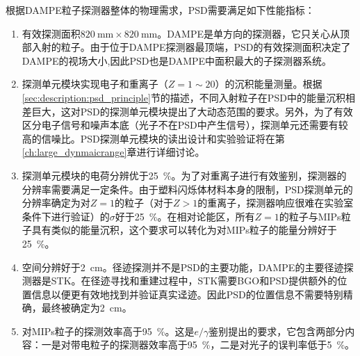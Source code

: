 根据DAMPE粒子探测器整体的物理需求，PSD需要满足如下性能指标：
\begin{enumerate}[noitemsep,topsep=0pt]
	\item 有效探测面积$\SI{820}{\milli\meter}\times\SI{820}{\milli\meter}$。DAMPE是单方向的探测器，它只关心从顶部入射的粒子。由于位于DAMPE探测器最顶端，PSD的有效探测面积决定了DAMPE的视场大小,因此PSD也是DAMPE中面积最大的子探测器系统。
	\item 探测单元模块实现电子和重离子（$Z=1\sim20$）的沉积能量测量。根据\ref{sec:description:psd_principle}节的描述，不同入射粒子在PSD中的能量沉积相差巨大，这对PSD的探测单元模块提出了大动态范围的要求。另外，为了有效区分电子信号和噪声本底（光子不在PSD中产生信号），探测单元还需要有较高的信噪比。PSD探测单元模块的读出设计和实验验证将在第\ref{ch:large_dynmaicrange}章进行详细讨论。
	\item 探测单元模块的电荷分辨优于\SI{25}{\percent}。为了对重离子进行有效鉴别，探测器的分辨率需要满足一定条件。由于塑料闪烁体材料本身的限制，PSD探测单元的分辨率确定为对$Z=1$的粒子（对于$Z>1$的重离子，探测器响应很难在实验室条件下进行验证）的$\sigma$好于\SI{25}{\percent}。在相对论能区，所有$Z=1$的粒子与MIPs粒子具有类似的能量沉积，这个要求可以转化为对MIPs粒子的能量分辨好于\SI{25}{\percent}。
	\item 空间分辨好于\SI{2}{\centi\meter}。径迹探测并不是PSD的主要功能，DAMPE的主要径迹探测器是STK。在径迹寻找和重建过程中，STK需要BGO和PSD提供额外的位置信息以便更有效地找到并验证真实迳迹。因此PSD的位置信息不需要特别精确，最终被确定为\SI{2}{\centi\meter}。
	\item 对MIPs粒子的探测效率高于\SI{95}{\percent}。这是$e/\gamma$鉴别提出的要求，它包含两部分内容：一是对带电粒子的探测器效率高于\SI{95}{\percent}，二是对光子的误判率低于\SI{5}{\percent}。
\end{enumerate}



